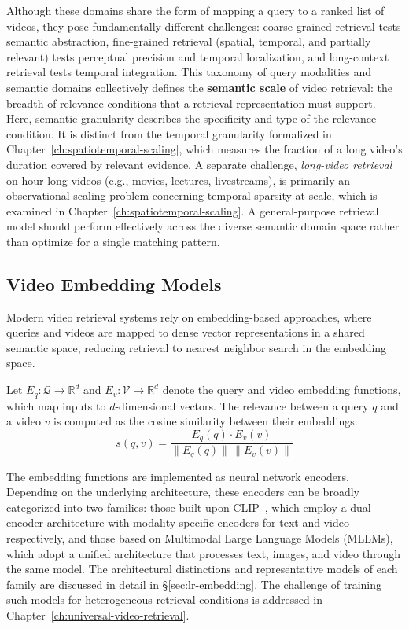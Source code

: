 Although these domains share the form of mapping a query to a ranked list of videos, they pose fundamentally different challenges: coarse-grained retrieval tests semantic abstraction, fine-grained retrieval (spatial, temporal, and partially relevant) tests perceptual precision and temporal localization, and long-context retrieval tests temporal integration. This taxonomy of query modalities and semantic domains collectively defines the \textbf{semantic scale} of video retrieval: the breadth of relevance conditions that a retrieval representation must support. Here, semantic granularity describes the specificity and type of the relevance condition. It is distinct from the temporal granularity formalized in Chapter~\ref{ch:spatiotemporal-scaling}, which measures the fraction of a long video's duration covered by relevant evidence. A separate challenge, \textit{long-video retrieval} on hour-long videos (e.g., movies, lectures, livestreams), is primarily an observational scaling problem concerning temporal sparsity at scale, which is examined in Chapter~\ref{ch:spatiotemporal-scaling}. A general-purpose retrieval model should perform effectively across the diverse semantic domain space rather than optimize for a single matching pattern.

\subsection{Video Embedding Models}
\label{sec:bc-embedder}

Modern video retrieval systems rely on embedding-based approaches, where queries and videos are mapped to dense vector representations in a shared semantic space, reducing retrieval to nearest neighbor search in the embedding space.

Let $E_q: \mathcal{Q} \rightarrow \mathbb{R}^d$ and $E_v: \mathcal{V} \rightarrow \mathbb{R}^d$ denote the query and video embedding functions, which map inputs to $d$-dimensional vectors. The relevance between a query $q$ and a video $v$ is computed as the cosine similarity between their embeddings:
\begin{equation}
    s(q, v) = \frac{E_q(q) \cdot E_v(v)}{\|E_q(q)\| \, \|E_v(v)\|}
\end{equation}

The embedding functions are implemented as neural network encoders. Depending on the underlying architecture, these encoders can be broadly categorized into two families: those built upon CLIP~\citep{radford2021learning}, which employ a dual-encoder architecture with modality-specific encoders for text and video respectively, and those based on Multimodal Large Language Models (MLLMs), which adopt a unified architecture that processes text, images, and video through the same model. The architectural distinctions and representative models of each family are discussed in detail in \S\ref{sec:lr-embedding}. The challenge of training such models for heterogeneous retrieval conditions is addressed in Chapter~\ref{ch:universal-video-retrieval}.

